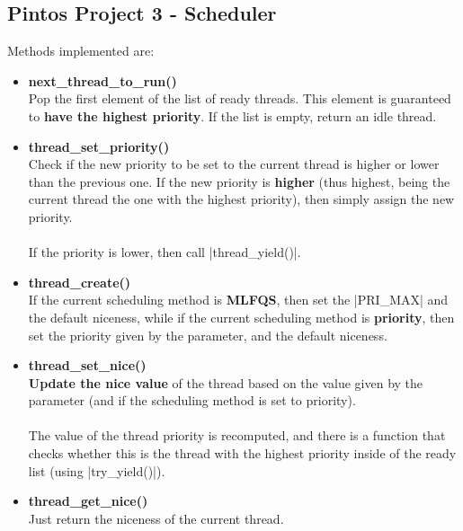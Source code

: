 \documentclass{article}
\begin{document}
\subsection{Pintos Project 3 - Scheduler}
Methods implemented are:

\begin{itemize}
	\item \textbf{next\_thread\_to\_run()}
	\vspace{.2cm} \\
	Pop the first element of the list of ready threads. This element is guaranteed to \textbf{have the highest priority}. If the list is empty, return an idle thread.
	
	\item \textbf{thread\_set\_priority()}
	\vspace{.2cm} \\
	Check if the new priority to be set to the current thread is higher or lower than the previous one. If the new priority is \textbf{higher} (thus highest, being the current thread the one with the highest priority), then simply assign the new priority. \\ \\
	If the priority is lower, then call \cverb|thread_yield()|.
	
	\item \textbf{thread\_create()}
	\vspace{.2cm} \\
	If the current scheduling method is \textbf{MLFQS}, then set the \cverb|PRI_MAX| and the default niceness, while if the current scheduling method is \textbf{priority}, then set the priority given by the parameter, and the default niceness.
	
	\item \textbf{thread\_set\_nice()}
	\vspace{.2cm} \\
	\textbf{Update the nice value} of the thread based on the value given by the parameter (and if the scheduling method is set to priority). \\ \\
	The value of the thread priority is recomputed, and there is a function that checks whether this is the thread with the highest priority inside of the ready list (using \cverb|try_yield()|).
	
	\item \textbf{thread\_get\_nice()}
	\vspace{.2cm} \\
	Just return the niceness of the current thread.
	

\end{itemize}
\end{document}
